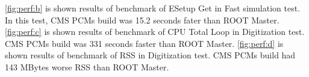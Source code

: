 \documentclass[12pt]{iopart}
\begin{document}
\ref{fig:perf:b} is shown results of benchmark of ESetup Get in Fast simulation test. In this test, CMS PCMs build was 15.2 seconds fater than ROOT Master.
\ref{fig:perf:c} is shown results of benchmark of CPU Total Loop in Digitization test. CMS PCMs build was 331 seconds faster than ROOT Master.
\ref{fig:perf:d} is shown results of benchmark of RSS in Digitization test. CMS PCMs build had 143 MBytes worse RSS than ROOT Master.

\begin{figure}
\centering
\begin{minipage}{.48\textwidth}
\end{minipage}\hfill
\begin{minipage}{.48\textwidth}

\end{minipage}
\end{figure}
\end{document}
